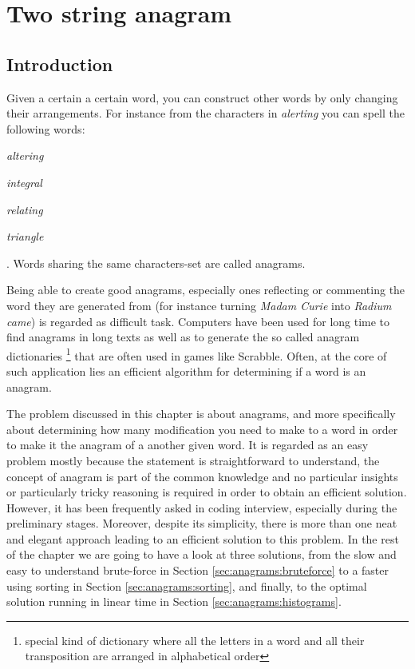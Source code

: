 %


\chapter{Two string anagram}
\label{ch:two_string_anagram}
\section*{Introduction}
Given a certain a certain word, you can construct other words by only changing their arrangements.
For instance from the characters in \textit{alerting} you can spell the following words:
\begin{enumerate*}
	\item \textit{altering}
	\item \textit{integral}
	\item \textit{relating}
	\item \textit{triangle}
\end{enumerate*}.
Words sharing the same characters-set are called anagrams. 

Being able to create good anagrams,
especially ones reflecting or commenting the word they are generated from (for instance turning
\textit{Madam Curie} into \textit{Radium came}) is regarded as difficult task.
Computers have been used for long time to find anagrams in long texts as well as to generate the so
called anagram dictionaries \footnote{special kind of dictionary where all the letters in a word and
all their transposition are arranged in alphabetical order} that are often used in games like
Scrabble. Often, at the core of such application lies an efficient algorithm for determining if a word is an anagram.

The problem discussed in this chapter is about anagrams, and more specifically about determining how many 
modification you need to make to a word in order to make it the anagram of a
another given word. It is regarded as an easy problem mostly because the statement is straightforward to
understand, the concept of anagram is part of the common knowledge and no particular insights or particularly
tricky reasoning is required in order to obtain an efficient solution. 
However, it has been frequently asked in coding interview, especially during the preliminary stages.
Moreover, despite its simplicity, there is more than one neat and elegant approach leading to an efficient
solution to this problem.
In the rest of the chapter we are going to have a look at three
solutions, from the slow and easy to understand brute-force in Section \ref{sec:anagrams:bruteforce} to a faster using
sorting in Section \ref{sec:anagrams:sorting}, and finally, to the optimal solution running in linear time in Section
\ref{sec:anagrams:histograms}. 

